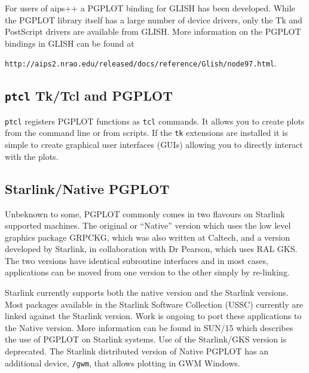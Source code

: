 \documentclass[twoside,11pt]{article}
\newcommand{\htmladdnormallink}[2]{#1}
\newcommand{\htmlref}[2]{#1}
\newcommand{\xref}[3]{#1}
\newcommand{\xlabel}[1]{}
\begin{document}
For users of aips++ a PGPLOT binding for \htmladdnormallink{GLISH}{http://www.cv.nrao.edu/glish/} has been developed. While the PGPLOT library itself has a large number of device drivers,
only the Tk and PostScript drivers are available from GLISH. More information on the PGPLOT bindings in GLISH can be found at 
\begin{htmlonly} \htmladdnormallink{{\tt http://aips2.nrao.edu/released/docs/reference/Glish/node97.html}}{http://aips2.nrao.edu/released/docs/reference/Glish/node97.html}.
\end{htmlonly} 

\subsection{\xlabel{sc15_pgtcl}{\tt ptcl} Tk/Tcl and PGPLOT\label{sc15_pgtcl}}

\htmladdnormallink{{\tt ptcl}}{http://www.InfoMagic.com/~nme2/ptcl/ptcl.html} registers PGPLOT functions as {\tt tcl} commands.  It allows you to create plots from the command line or from scripts. If the {\tt tk} extensions are installed it is simple to create graphical user interfaces (GUIs) allowing you to directly interact with the plots. 

\subsection{\xlabel{sc15_pgstar}Starlink/Native PGPLOT\label{sc15_pgstar}}

Unbeknown to some, PGPLOT commonly comes in two flavours on Starlink supported machines. The original or ``Native'' version which uses the low level graphics package GRPCKG, which was also written at Caltech, and a version developed by Starlink, in collaboration with Dr Pearson, which uses \htmlref{RAL GKS}{sc15_gks}. The two versions have identical subroutine
interfaces and in most cases, applications can be moved from one version to the 
other simply by re-linking. 

Starlink currently supports both the native version and the Starlink versions. Most packages available in the Starlink Software Collection (USSC) currently are linked against the Starlink version. Work is ongoing to port these applications to the Native version. More information can be found in \xref{SUN/15}{sun15}{} which describes the use of PGPLOT on Starlink systems. Use of the Starlink/GKS version is deprecated. The Starlink distributed version of Native PGPLOT has an additional device, {\tt /gwm}, that allows plotting in GWM Windows.
\end{document}
